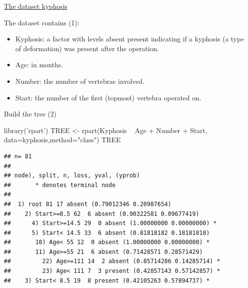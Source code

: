 \documentclass[
  10pt,
  ignorenonframetext,
]{beamer}
\newenvironment{Shaded}{}{}
\newcommand{\DataTypeTok}[1]{#1}
\newcommand{\KeywordTok}[1]{\textcolor[rgb]{0.00,0.00,1.00}{#1}}
\newcommand{\NormalTok}[1]{#1}
\newcommand{\OperatorTok}[1]{#1}
\newcommand{\StringTok}[1]{\textcolor[rgb]{0.00,0.50,0.50}{#1}}
\providecommand{\tightlist}{%
  \setlength{\itemsep}{0pt}\setlength{\parskip}{0pt}}
\begin{document}
\begin{frame}{\href{https://www.r-exercises.com/2016/12/13/recursive-partitioning-and-regression-trees-solutions/}{The
dataset kyphosis}}
\protect\hypertarget{the-dataset-kyphosis}{}

\begin{block}{The dataset contains (1):}

\begin{itemize}
\tightlist
\item
  Kyphosis: a factor with levels absent present indicating if a kyphosis
  (a type of deformation) was present after the operation.
\item
  Age: in months.
\item
  Number: the number of vertebrae involved.
\item
  Start: the number of the first (topmost) vertebra operated on.
\end{itemize}

\end{block}

\end{frame}

\begin{frame}[fragile]{Build the tree (2)}
\protect\hypertarget{build-the-tree-2}{}

\begin{Shaded}
\begin{Highlighting}[]
\KeywordTok{library}\NormalTok{(}\StringTok{'rpart'}\NormalTok{)}
\NormalTok{TREE <-}\StringTok{ }\KeywordTok{rpart}\NormalTok{(Kyphosis }\OperatorTok{~}\StringTok{ }\NormalTok{Age }\OperatorTok{+}\StringTok{ }\NormalTok{Number }\OperatorTok{+}\StringTok{ }\NormalTok{Start, }
              \DataTypeTok{data=}\NormalTok{kyphosis,}\DataTypeTok{method=}\StringTok{"class"}\NormalTok{)}
\NormalTok{TREE}
\end{Highlighting}
\end{Shaded}

\begin{verbatim}
## n= 81 
## 
## node), split, n, loss, yval, (yprob)
##       * denotes terminal node
## 
##  1) root 81 17 absent (0.79012346 0.20987654)  
##    2) Start>=8.5 62  6 absent (0.90322581 0.09677419)  
##      4) Start>=14.5 29  0 absent (1.00000000 0.00000000) *
##      5) Start< 14.5 33  6 absent (0.81818182 0.18181818)  
##       10) Age< 55 12  0 absent (1.00000000 0.00000000) *
##       11) Age>=55 21  6 absent (0.71428571 0.28571429)  
##         22) Age>=111 14  2 absent (0.85714286 0.14285714) *
##         23) Age< 111 7  3 present (0.42857143 0.57142857) *
##    3) Start< 8.5 19  8 present (0.42105263 0.57894737) *
\end{verbatim}

\end{frame}
\end{document}
